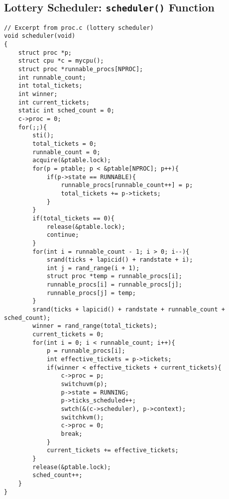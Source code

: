 \documentclass[12pt]{article}
\begin{document}
\subsection*{Lottery Scheduler: \texttt{scheduler()} Function}
\begin{lstlisting}
// Excerpt from proc.c (lottery scheduler)
void scheduler(void)
{
    struct proc *p;
    struct cpu *c = mycpu();
    struct proc *runnable_procs[NPROC];
    int runnable_count;
    int total_tickets;
    int winner;
    int current_tickets;
    static int sched_count = 0;
    c->proc = 0;
    for(;;){
        sti();
        total_tickets = 0;
        runnable_count = 0;
        acquire(&ptable.lock);
        for(p = ptable; p < &ptable[NPROC]; p++){
            if(p->state == RUNNABLE){
                runnable_procs[runnable_count++] = p;
                total_tickets += p->tickets;
            }
        }
        if(total_tickets == 0){
            release(&ptable.lock);
            continue;
        }
        for(int i = runnable_count - 1; i > 0; i--){
            srand(ticks + lapicid() + randstate + i);
            int j = rand_range(i + 1);
            struct proc *temp = runnable_procs[i];
            runnable_procs[i] = runnable_procs[j];
            runnable_procs[j] = temp;
        }
        srand(ticks + lapicid() + randstate + runnable_count + sched_count);
        winner = rand_range(total_tickets);
        current_tickets = 0;
        for(int i = 0; i < runnable_count; i++){
            p = runnable_procs[i];
            int effective_tickets = p->tickets;
            if(winner < effective_tickets + current_tickets){
                c->proc = p;
                switchuvm(p);
                p->state = RUNNING;
                p->ticks_scheduled++;
                swtch(&(c->scheduler), p->context);
                switchkvm();
                c->proc = 0;
                break;
            }
            current_tickets += effective_tickets;
        }
        release(&ptable.lock);
        sched_count++;
    }
}
\end{lstlisting}
\end{document}
